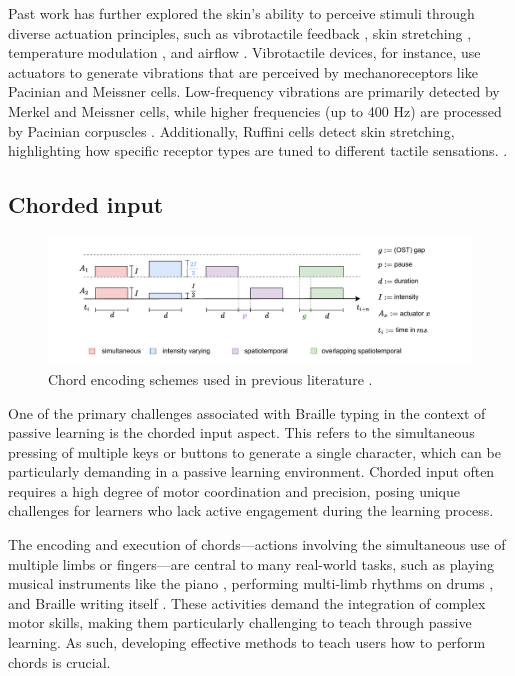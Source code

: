 Past work has further explored the skin's ability to perceive stimuli through diverse actuation principles, such as vibrotactile feedback \cite{Fang2020}, skin stretching \cite{wang2019masque}, temperature modulation \cite{peiris2019thermalbracelet}, and airflow \cite{tseng2020skin}. Vibrotactile devices, for instance, use actuators to generate vibrations that are perceived by mechanoreceptors like Pacinian and Meissner cells. Low-frequency vibrations are primarily detected by Merkel and Meissner cells, while higher frequencies (up to 400 Hz) are processed by Pacinian corpuscles \cite{Fang2022a, lo1984regional}. Additionally, Ruffini cells detect skin stretching, highlighting how specific receptor types are tuned to different tactile sensations. \cite{Fang2022a, lo1984regional, Fang2022a}.

\subsection*{Chorded input}


\begin{figure}
    \centering
    \includegraphics[width=\linewidth]{src//pictures/ost_diagram.drawio.pdf}
    \caption{Chord encoding schemes used in previous literature \cite{Luzhnica2017,Luzhnica2016,Luzhnica2018,Luzhnica2018a}.}
    \label{fig:chord_encoding}
\end{figure}

One of the primary challenges associated with Braille typing in the context of passive learning is the chorded input aspect. This refers to the simultaneous pressing of multiple keys or buttons to generate a single character, which can be particularly demanding in a passive learning environment. Chorded input often requires a high degree of motor coordination and precision, posing unique challenges for learners who lack active engagement during the learning process.

The encoding and execution of chords—actions involving the simultaneous use of multiple limbs or fingers—are central to many real-world tasks, such as playing musical instruments like the piano \cite{Seim2014, Seim2015b, Huang2008, Kohlsdorf2010, Huang2010, Seim2014a, Vaio6810, Donchev2021, Fang2023a, Fang2023}, performing multi-limb rhythms on drums \cite{Bouwer2011, Holland2010}, and Braille writing itself \cite{Learning2024, Seim2017, Seim2014a}. These activities demand the integration of complex motor skills, making them particularly challenging to teach through passive learning. As such, developing effective methods to teach users how to perform chords is crucial.

